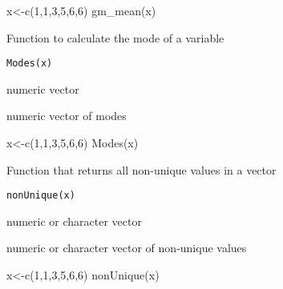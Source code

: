 \documentclass[a4paper]{book}
\begin{document}
%
\begin{Examples}
\begin{ExampleCode}
x<-c(1,1,3,5,6,6)
gm_mean(x)

\end{ExampleCode}
\end{Examples}
%
\begin{Description}\relax
Function to calculate the mode of a variable
\end{Description}
%
\begin{Usage}
\begin{verbatim}
Modes(x)
\end{verbatim}
\end{Usage}
%
\begin{Arguments}
\begin{ldescription}
\item[\code{x}] numeric vector
\end{ldescription}
\end{Arguments}
%
\begin{Value}
numeric vector of modes
\end{Value}
%
\begin{Examples}
\begin{ExampleCode}
x<-c(1,1,3,5,6,6)
Modes(x)

\end{ExampleCode}
\end{Examples}
%
\begin{Description}\relax
Function that returns all non-unique values in a vector
\end{Description}
%
\begin{Usage}
\begin{verbatim}
nonUnique(x)
\end{verbatim}
\end{Usage}
%
\begin{Arguments}
\begin{ldescription}
\item[\code{x}] numeric or character vector
\end{ldescription}
\end{Arguments}
%
\begin{Value}
numeric or character vector of non-unique values
\end{Value}
%
\begin{Examples}
\begin{ExampleCode}
x<-c(1,1,3,5,6,6)
nonUnique(x)

\end{ExampleCode}
\end{Examples}
\printindex{}
\end{document}
